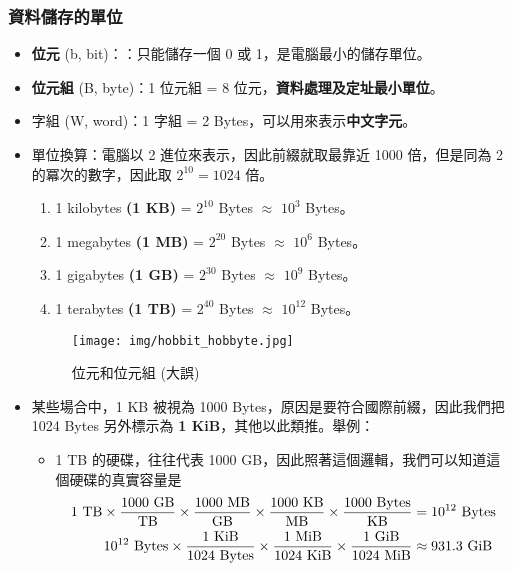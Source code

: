 \documentclass[12pt,a4paper,oneside]{book}
\begin{document}
\begin{CJK}{UTF8}{bkai}
\subsubsection{資料儲存的單位}
\begin{itemize}
\item \textbf{位元} (b, bit)：：只能儲存一個 0 或 1，是電腦最小的儲存單位。
\item \textbf{位元組} (B, byte)：1 位元組 = 8 位元，\textbf{資料處理及定址最小單位}。
\item 字組 (W, word)：1 字組 = 2 Bytes，可以用來表示\textbf{中文字元}。
\item 單位換算：電腦以 2 進位來表示，因此前綴就取最靠近 1000 倍，但是同為 2 的冪次的數字，因此取 $ 2^{10} = 1024$ 倍。
  \begin{enumerate}
  \item 1 kilobytes \textbf{(1 KB)} = $2^{10}$ Bytes $\approx$ $10^{3}$ Bytes。
  \item 1 megabytes \textbf{(1 MB)} = $2^{20}$ Bytes $\approx$ $10^{6}$ Bytes。
  \item 1 gigabytes \textbf{(1 GB)} = $2^{30}$ Bytes $\approx$ $10^{9}$ Bytes。
  \item 1 terabytes \textbf{(1 TB)} = $2^{40}$ Bytes $\approx$ $10^{12}$ Bytes。
  \end{enumerate}

\begin{figure}[h!]
  \centering
  \label{fig:hobbyte}
  \texttt{[image: img/hobbit\_hobbyte.jpg]}
  \caption{位元和位元組 (大誤)}
\end{figure}

\item 某些場合中，1 KB 被視為 1000 Bytes，原因是要符合國際前綴，因此我們把 1024 Bytes 另外標示為 \textbf{1 KiB}，其他以此類推。舉例：
  \begin{itemize}
  \item 1 TB 的硬碟，往往代表 1000 GB，因此照著這個邏輯，我們可以知道這個硬碟的真實容量是
    \begin{align*}
      {1\text{ TB}}\times{1000\text{ GB}\over\text{TB}}\times{1000\text{ MB}\over\text{GB}}\times{1000\text{ KB}\over\text{MB}}\times{1000\text{ Bytes}\over\text{KB}}&=10^{12}\text{ Bytes}\\
      {10^{12}\text{ Bytes}}\times{1\text{ KiB}\over{1024\text{ Bytes}}}\times{1\text{ MiB}\over{1024\text{ KiB}}}\times{1\text{ GiB}\over{1024\text{ MiB}}}&\approx{}931.3\text{ GiB}
    \end{align*}
  \end{itemize}
\end{itemize}


\end{CJK}
\end{document}
